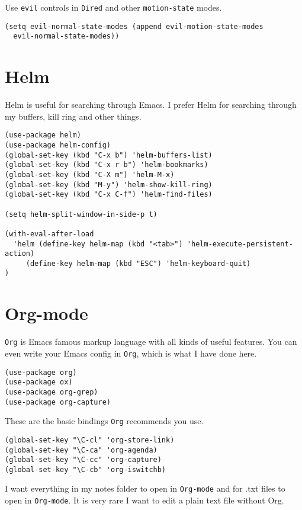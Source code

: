 \documentclass{article}
\begin{document}
Use \texttt{evil} controls in \texttt{Dired} and other \texttt{motion-state} modes.

\begin{verbatim}
(setq evil-normal-state-modes (append evil-motion-state-modes
  evil-normal-state-modes))
\end{verbatim}

\section{Helm}
\label{sec-8}
Helm is useful for searching through Emacs. I prefer Helm for searching through my buffers, kill ring and other things.

\begin{verbatim}
(use-package helm)
(use-package helm-config)
(global-set-key (kbd "C-x b") 'helm-buffers-list)
(global-set-key (kbd "C-x r b") 'helm-bookmarks)
(global-set-key (kbd "C-X m") 'helm-M-x)
(global-set-key (kbd "M-y") 'helm-show-kill-ring)
(global-set-key (kbd "C-x C-f") 'helm-find-files)

(setq helm-split-window-in-side-p t)

(with-eval-after-load
  'helm (define-key helm-map (kbd "<tab>") 'helm-execute-persistent-action)
     (define-key helm-map (kbd "ESC") 'helm-keyboard-quit)
)
\end{verbatim}

\section{Org-mode}
\label{sec-9}

\texttt{Org} is Emacs famous markup language with all kinds of useful features. You can even write your Emacs config in \texttt{Org}, which is what I have done here.

\begin{verbatim}
(use-package org)
(use-package ox)
(use-package org-grep)
(use-package org-capture)
\end{verbatim}

These are the basic bindings \texttt{Org} recommends you use.

\begin{verbatim}
(global-set-key "\C-cl" 'org-store-link)
(global-set-key "\C-ca" 'org-agenda)
(global-set-key "\C-cc" 'org-capture)
(global-set-key "\C-cb" 'org-iswitchb)
\end{verbatim}

I want everything in my notes folder to open in \texttt{Org-mode} and for .txt files to open in \texttt{Org-mode}. It is very rare I want to edit a plain text file without Org.
\end{document}
